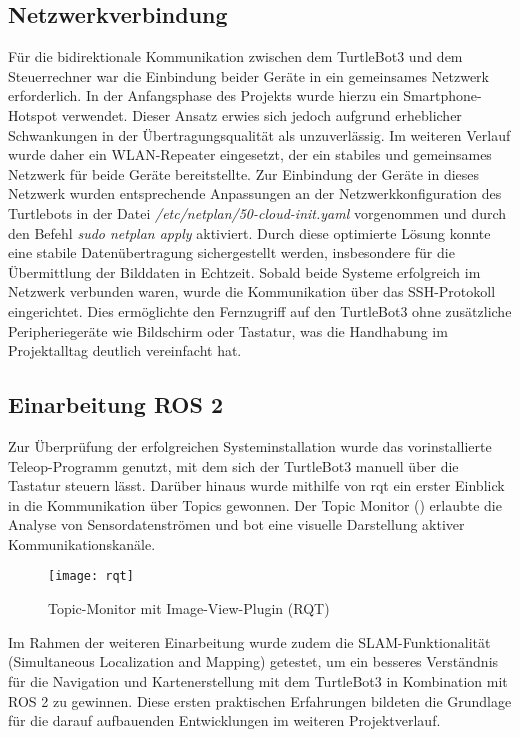 \subsection{Netzwerkverbindung}
Für die bidirektionale Kommunikation zwischen dem TurtleBot3 und dem Steuerrechner war die Einbindung beider Geräte in ein gemeinsames Netzwerk erforderlich. 
In der Anfangsphase des Projekts wurde hierzu ein Smartphone-Hotspot verwendet. 
Dieser Ansatz erwies sich jedoch aufgrund erheblicher Schwankungen in der Übertragungsqualität als unzuverlässig.
\newPar
Im weiteren Verlauf wurde daher ein WLAN-Repeater eingesetzt, der ein stabiles und gemeinsames Netzwerk für beide Geräte bereitstellte. 
Zur Einbindung der Geräte in dieses Netzwerk wurden entsprechende Anpassungen an der Netzwerkkonfiguration des Turtlebots in der Datei \textit{/etc/netplan/50-cloud-init.yaml} vorgenommen und durch den Befehl \textit{sudo netplan apply} aktiviert.
Durch diese optimierte Lösung konnte eine stabile Datenübertragung sichergestellt werden, insbesondere für die Übermittlung der Bilddaten in Echtzeit.
\newPar
Sobald beide Systeme erfolgreich im Netzwerk verbunden waren, wurde die Kommunikation über das SSH-Protokoll eingerichtet. 
Dies ermöglichte den Fernzugriff auf den TurtleBot3 ohne zusätzliche Peripheriegeräte wie Bildschirm oder Tastatur, was die Handhabung im Projektalltag deutlich vereinfacht hat.
\subsection{Einarbeitung ROS 2}
Zur Überprüfung der erfolgreichen Systeminstallation wurde das vorinstallierte Teleop-Programm genutzt, mit dem sich der TurtleBot3 manuell über die Tastatur steuern lässt. 
Darüber hinaus wurde mithilfe von rqt ein erster Einblick in die Kommunikation über Topics gewonnen. 
Der Topic Monitor () erlaubte die Analyse von Sensordatenströmen und bot eine visuelle Darstellung aktiver Kommunikationskanäle.
\begin{figure}[H]
    \centering
    \texttt{[image: rqt]}
    \caption{Topic-Monitor mit Image-View-Plugin (RQT)}\label{rqt}
\end{figure}
Im Rahmen der weiteren Einarbeitung wurde zudem die SLAM-Funktionalität (Simultaneous Localization and Mapping) getestet, um ein besseres Verständnis für die Navigation und Kartenerstellung mit dem TurtleBot3 in Kombination mit ROS 2 zu gewinnen. 
Diese ersten praktischen Erfahrungen bildeten die Grundlage für die darauf aufbauenden Entwicklungen im weiteren Projektverlauf.
